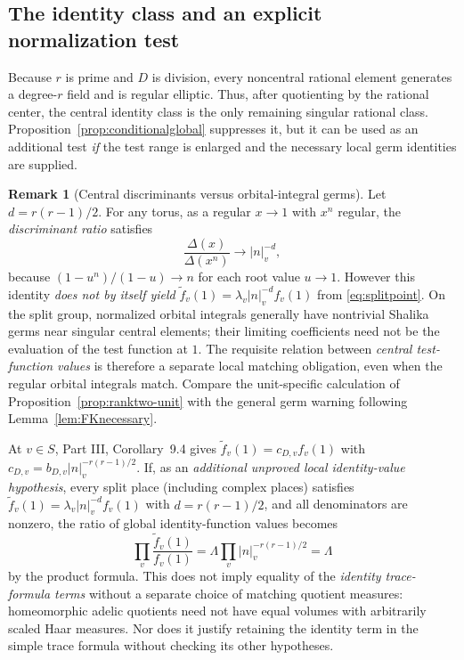 \documentclass[11pt]{article}
\theoremstyle{plain}
\theoremstyle{definition}
\newtheorem{remark}[theorem]{Remark}
\begin{document}
\subsection{The identity class and an explicit normalization test}
\label{subsec:identity-test}
Because $r$ is prime and $D$ is division, every noncentral
rational element generates a degree-$r$ field and is regular
elliptic.  Thus, after quotienting by the rational center, the
central identity class is the only remaining singular rational
class.  Proposition~\ref{prop:conditionalglobal} suppresses it,
but it can be used as an additional test \emph{if} the test range
is enlarged and the necessary local germ identities are supplied.
\begin{remark}[Central discriminants versus orbital-integral germs]
\label{rem:identity-germs}
Let $d=r(r-1)/2$.  For any torus, as a regular $x\to1$
with $x^n$ regular, the \emph{discriminant ratio} satisfies
\[
 \frac{\Delta(x)}{\Delta(x^n)}\longrightarrow |n|_v^{-d},
\]
because $(1-u^n)/(1-u)\to n$ for each root value $u\to1$.
However this identity \emph{does not by itself yield}
$\widetilde f_v(1)=\lambda_v|n|_v^{-d}f_v(1)$
from \eqref{eq:splitpoint}.  On the split group, normalized
orbital integrals generally have nontrivial Shalika germs near
singular central elements; their limiting coefficients need not
be the evaluation of the test function at $1$.  The requisite
relation between \emph{central test-function values} is therefore
a separate local matching obligation, even when the regular
orbital integrals match.  Compare the unit-specific calculation
of Proposition~\ref{prop:ranktwo-unit} with the general
germ warning following Lemma~\ref{lem:FKnecessary}.
\end{remark}

At $v\in S$, Part III, Corollary~9.4 gives
$\widetilde f_v(1)=c_{D,v}f_v(1)$ with
$c_{D,v}=b_{D,v}|n|_v^{-r(r-1)/2}$.  If, as an \emph{additional unproved local identity-value
hypothesis}, every split place (including complex places) satisfies
$\widetilde f_v(1)=\lambda_v|n|_v^{-d}f_v(1)$ with
$d=r(r-1)/2$, and all denominators are nonzero, the ratio of
global identity-function values becomes
\begin{equation}\label{eq:identityproduct}
 \prod_v\frac{\widetilde f_v(1)}{f_v(1)}
   =\Lambda\prod_v|n|_v^{-r(r-1)/2}
   =\Lambda
\end{equation}
by the product formula.  This does not imply equality of the
\emph{identity trace-formula terms} without a separate choice of
matching quotient measures: homeomorphic adelic quotients need
not have equal volumes with arbitrarily scaled Haar measures.
Nor does it justify retaining the identity term in the simple
trace formula without checking its other hypotheses.
\end{document}

